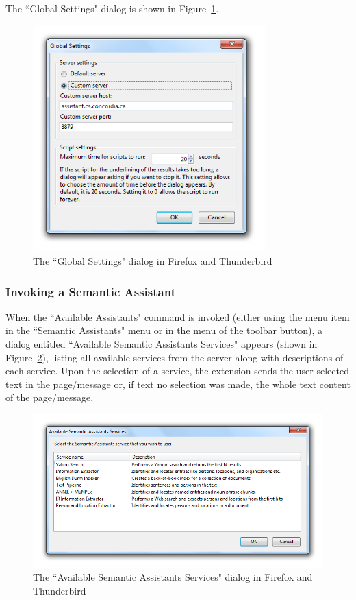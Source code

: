 The ``Global Settings" dialog is shown in Figure~\ref{fig:mozilla_features_global_settings}. 

\begin{figure}[htb]
  \centering
  \includegraphics[width=0.8\textwidth]{pictures/mozilla_features_global_settings.png}
  \caption{The ``Global Settings" dialog in Firefox and Thunderbird}
  \label{fig:mozilla_features_global_settings}
\end{figure}

\subsubsection{Invoking a Semantic Assistant}
When the ``Available Assistants" command is invoked (either using the menu item in the ``Semantic Assistants" menu or in the menu of the toolbar button), a dialog entitled ``Available Semantic Assistants Services" appears (shown in Figure~\ref{fig:mozilla_features_available_assistants_dialog}), listing all available services from the server along with descriptions of each service. Upon the selection of a service, the extension sends the user-selected text in the page/message or, if text no selection was made, the whole text content of the page/message.

\begin{figure}[htb]
  \centering
  \includegraphics[width=1\textwidth]{pictures/mozilla_features_available_assistants_dialog.png}
  \caption{The ``Available Semantic Assistants Services" dialog in Firefox and Thunderbird}
  \label{fig:mozilla_features_available_assistants_dialog}
\end{figure}

